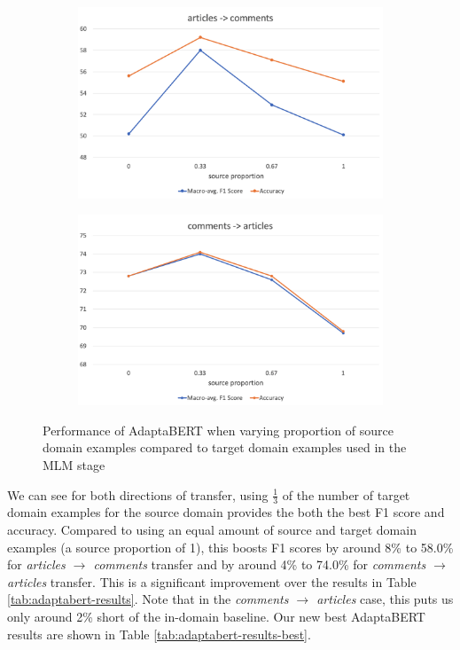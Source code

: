 \begin{figure}[ht]
    \centering
    \begin{subfigure}{\textwidth}
        \centering
        \includegraphics[scale=0.3]{0-img/src-proportion-articles-comments.png}
    \end{subfigure}
    \begin{subfigure}{\textwidth}
        \centering
        \includegraphics[scale=0.3]{0-img/src-proportion-comments-articles.png}
    \end{subfigure}
    \caption{Performance of AdaptaBERT when varying proportion of source domain examples compared to target domain examples used in the MLM stage}
    \label{fig:src-proportion}
\end{figure}

We can see for both directions of transfer, using $ \frac{1}{3} $ of the number of target domain examples for the source domain provides the both the best F1 score and accuracy. Compared to using an equal amount of source and target domain examples (a source proportion of 1), this boosts F1 scores by around 8\% to 58.0\% for \textit{articles $ \rightarrow $ comments} transfer and by around 4\% to 74.0\% for \textit{comments $ \rightarrow $ articles} transfer. This is a significant improvement over the results in Table \ref{tab:adaptabert-results}. Note that in the \textit{comments $ \rightarrow $ articles} case, this puts us only around 2\% short of the in-domain baseline. Our new best AdaptaBERT results are shown in Table \ref{tab:adaptabert-results-best}.

